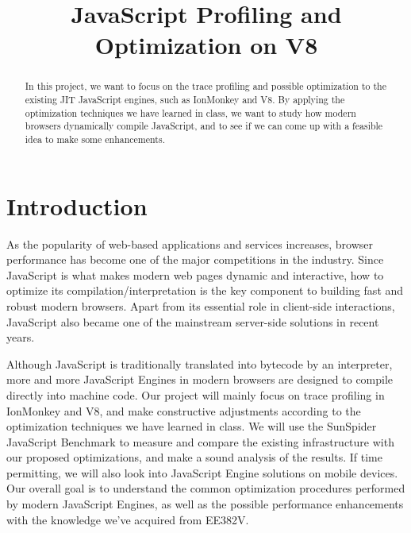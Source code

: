 \documentclass[conference]{IEEEtran}
\begin{document}
\title{JavaScript Profiling and Optimization on V8}

\author{
\and
{}
}

\maketitle

\begin{abstract}
In this project, we want to focus on the trace profiling and possible optimization to the existing JIT JavaScript engines, such as IonMonkey and V8. By applying the optimization techniques we have learned in class, we want to study how modern browsers dynamically compile JavaScript, and to see if we can come up with a feasible idea to make some enhancements.

\end{abstract}

\section{Introduction}
As the popularity of web-based applications and services increases, browser performance has become one of the major competitions in the industry. Since JavaScript is what makes modern web pages dynamic and interactive, how to optimize its compilation/interpretation is the key component to building fast and robust modern browsers. Apart from its essential role in client-side interactions, JavaScript also became one of the mainstream server-side solutions in recent years\cite{node}. 

Although JavaScript is traditionally translated into bytecode by an interpreter, more and more JavaScript Engines in modern browsers  are designed to compile directly into machine code. Our project will mainly focus on trace profiling\cite{Trace} in IonMonkey and V8, and make constructive adjustments according to the optimization techniques we have learned in class. We will use the SunSpider JavaScript Benchmark to measure and compare the existing infrastructure with our proposed optimizations, and make a sound analysis of the results. If time permitting, we will also look into JavaScript Engine solutions on mobile devices. Our overall goal is to understand the common optimization procedures performed by modern JavaScript Engines, as well as the possible performance enhancements with the knowledge we've acquired from EE382V. 
\end{document}
